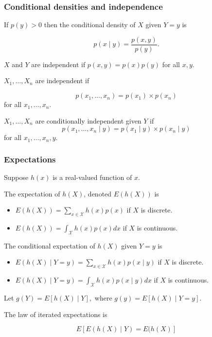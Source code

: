 \documentclass[mathserif]{beamer}
\begin{document}
\begin{frame}
\frametitle{Conditional densities and independence}

If $p(y) > 0$ then the conditional density of $X$ given $Y = y$ is 

$$p(x \mid y) = \frac{p(x , y)}{p(y)}.$$

\vspace*{1em}

$X$ and $Y$ are independent if $p(x , y) = p(x) p(y)$ for all $x,y.$

\vspace*{1em}

$X_1, \ldots, X_n$ are independent if 

$$p(x_1, \ldots, x_n) = p(x_1) \times p(x_n)$$ for all $x_1, \ldots, x_n.$

\vspace*{1em}

$X_1, \ldots, X_n$ are conditionally independent given $Y$ if 
$$p(x_1, \ldots, x_n \mid y) = p(x_1 \mid y) \times p(x_n \mid y)$$
for all $x_1, \ldots, x_n, y.$

\end{frame}

\begin{frame}
\frametitle{Expectations}

Suppose $h(x)$ is a real-valued function of $x.$

The expectation of $h(X)$, denoted $ E(h(X))$ is 
\begin{itemize}
\item $E(h(X)) = \sum_{x \in \mathcal{X}} h(x) p(x)$ if $X$ is discrete. 
\item $E(h(X)) = \int_{\mathcal{X}} h(x) p(x) dx$ if $X$ is continuous.
\end{itemize}

\vspace*{1em}

The conditional expectation of $h(X)$ given $Y=y$ is 
\begin{itemize}
\item $E(h(X) \mid Y=y) = \sum_{x \in \mathcal{X}} h(x) p(x \mid y)$ if $X$ is discrete. 
\item $E(h(X) \mid Y=y) = \int_{\mathcal{X}} h(x) p(x \mid y) dx$ if $X$ is continuous.
\end{itemize}

\vspace*{1em}

Let $g(Y) = E[h(X) \mid Y],$ where $g(y) = E[ h(X) \mid Y = y ].$

\vspace*{0.5em}
The law of iterated expectations is 

$$E\left[
E(h(X) \mid Y)
= E(h(X)
\right]
$$

\end{frame}
\end{document}
